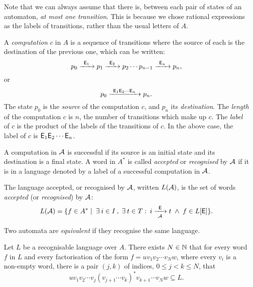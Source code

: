 Note that we can always assume that there is, between each pair of states of an automaton, \emph{at most one transition}. This is because we chose rational expressions as the labels of transitions, rather than the usual letters of $A$.

A \emph{computation} $c$ in $A$ is a sequence of transitions where the source of each is the destination of the previous one, which can be written:
\[
    p_0 {\; \xrightarrow[]{\: \; {\mathsf{E}}_1 \: \;} \;} p_1 {\; \xrightarrow[]{\: \; {\mathsf{E}}_2 \: \;} \;} p_2 \dotsm p_{n-1} {\; \xrightarrow[]{\: \; {\mathsf{E}}_n \: \;} \;} p_n,
\]
or
\[
    p_0 {\; \xrightarrow[]{\: \; {\mathsf{E}}_1 {\mathsf{E}}_2 \dotsm {\mathsf{E}}_n \: \;} \;} p_n.
\]
The state $p_0$ is the \emph{source} of the computation $c$, and $p_n$ its \emph{destination}. The \emph{length} of the computation $c$ is $n$, the number of transitions which make up $c$. The \emph{label} of $c$ is the product of the labels of the transitions of $c$. In the above case, the label of $c$ is ${\mathsf{E}}_1 {\mathsf{E}}_2 \dotsm {\mathsf{E}}_n$.

A computation in ${\mathcal{A}}$ is successful if its source is an initial state and its destination is a final state. A word in $A^*$ is called \emph{accepted} or \emph{recognised} by ${\mathcal{A}}$ if it is in a language denoted by a label of a successful computation in ${\mathcal{A}}$.

\begin{defn}
    The language accepted, or recognised by ${\mathcal{A}}$, written $L({\mathcal{A}})$, is the set of words \emph{accepted} (or \emph{recognised}) by ${\mathcal{A}}$:
    \[
        L({\mathcal{A}}) = \{ f \in A^* \mid \; \exists \: i \in I \: , \; \exists \: t \in T : \: i {\; \xrightarrow[{\mathcal{A}}]{\: \; {\mathsf{E}} \: \;} \;} t \; \wedge \; f \in L[{\mathsf{E}}] \}.
    \]
\end{defn}

Two automata are \emph{equivalent} if they recognise the same language.

\begin{lemma}\label{lm:block_star_lemma}
    Let $L$ be a recognisable language over $A$. There exists $N \in \mathbb{N}$ that for every word $f$ in $L$ and every factorisation of the form $f = u v_1 v_2 \dotsm v_N w$, where every $v_i$ is a non-empty word, there is a pair $(j,k)$ of indices, $0 \leq j < k \leq N$, that
    \[
        u v_1 v_2 \dotsm v_j {(v_{j+1} \dotsm v_k)}^* v_{k+1} \dotsm v_N w \subseteq L.
    \]
\end{lemma}

